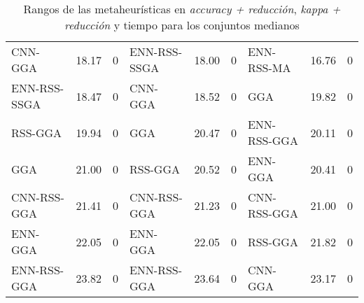 \begin{table}[]
\begin{adjustbox}{max width =\textwidth}
\begin{tabular}{l c c|l c c|l c c}
CNN-GGA      & 18.17 & 0 & ENN-RSS-SSGA & 18.00 & 0  & ENN-RSS-MA   & 16.76 & 0 \\
ENN-RSS-SSGA & 18.47 & 0 & CNN-GGA      & 18.52 & 0  & GGA          & 19.82 & 0 \\
RSS-GGA      & 19.94 & 0 & GGA          & 20.47 & 0  & ENN-RSS-GGA  & 20.11 & 0 \\
GGA          & 21.00 & 0 & RSS-GGA      & 20.52 & 0  & ENN-GGA      & 20.41 & 0 \\
CNN-RSS-GGA  & 21.41 & 0 & CNN-RSS-GGA  & 21.23 & 0  & CNN-RSS-GGA  & 21.00 & 0 \\
ENN-GGA      & 22.05 & 0 & ENN-GGA      & 22.05 & 0  & RSS-GGA      & 21.82 & 0 \\
ENN-RSS-GGA  & 23.82 & 0 & ENN-RSS-GGA  & 23.64 & 0  & CNN-GGA      & 23.17 & 0 \\

\hline
\end{tabular}
\end{adjustbox}
\caption{Rangos de las metaheurísticas en \emph{accuracy + reducción}, \emph{kappa + reducción} y tiempo para los conjuntos medianos}
\label{table-inits-rank}
\end{table}


